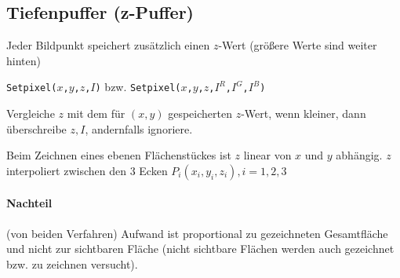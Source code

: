 	\subsection{Tiefenpuffer (z-Puffer)}
	Jeder Bildpunkt speichert zusätzlich einen $z$-Wert (größere Werte sind weiter hinten)
	\begin{center}
		\texttt{Setpixel($x$,$y$,$z$,$I$)} bzw. \texttt{Setpixel($x$,$y$,$z$,$I^R$,$I^G$,$I^B$)}
	\end{center}
	Vergleiche $z$ mit dem für $(x,y)$ gespeicherten $z$-Wert, wenn kleiner, dann überschreibe $z, I$, andernfalls
	ignoriere.
	
	Beim Zeichnen eines ebenen Flächenstückes ist $z$ linear von $x$ und $y$ abhängig. $z$ interpoliert zwischen
	den 3 Ecken $P_i(x_i,y_i,z_i), i = 1, 2, 3$
	\paragraph{Nachteil} (von beiden Verfahren) Aufwand ist proportional zu gezeichneten Gesamtfläche und nicht
 	zur sichtbaren Fläche (nicht sichtbare Flächen werden auch gezeichnet bzw. zu zeichnen versucht).




